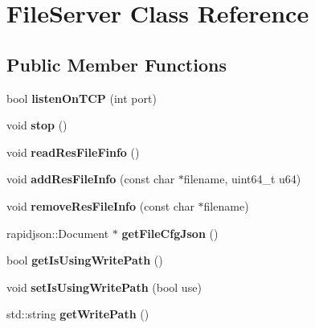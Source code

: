 \hypertarget{classFileServer}{}\section{File\+Server Class Reference}
\label{classFileServer}
\subsection*{Public Member Functions}
\begin{DoxyCompactItemize}
\item 
\mbox{\label{classFileServer_adb966da7fbc6412ca2a43856cfc695a0}} 
bool {\bfseries listen\+On\+T\+CP} (int port)
\item 
\mbox{\label{classFileServer_ac37e9a1c3f5a30c5f6aff839c013c0a2}} 
void {\bfseries stop} ()
\item 
\mbox{\label{classFileServer_a5c620c11f77bd59b62894712784f3810}} 
void {\bfseries read\+Res\+File\+Finfo} ()
\item 
\mbox{\label{classFileServer_a8756cd11fb16804099c94592c84b4794}} 
void {\bfseries add\+Res\+File\+Info} (const char $\ast$filename, uint64\+\_\+t u64)
\item 
\mbox{\label{classFileServer_aadf12d3ca48db06d5e809c87d4b49ee7}} 
void {\bfseries remove\+Res\+File\+Info} (const char $\ast$filename)
\item 
\mbox{\label{classFileServer_a26265371ddfdd4ef9c51d9852f3b6db0}} 
rapidjson\+::\+Document $\ast$ {\bfseries get\+File\+Cfg\+Json} ()
\item 
\mbox{\label{classFileServer_a77f8b4396ac234a2823eec62da214683}} 
bool {\bfseries get\+Is\+Using\+Write\+Path} ()
\item 
\mbox{\label{classFileServer_a3db338e383a7585ca0041f7de893ffd2}} 
void {\bfseries set\+Is\+Using\+Write\+Path} (bool use)
\item 
\mbox{\label{classFileServer_add801bb5fc8d7461af75b9046c911d31}} 
std\+::string {\bfseries get\+Write\+Path} ()

\end{DoxyCompactItemize}
